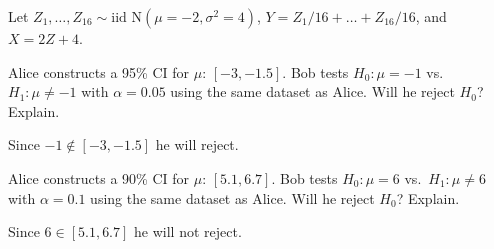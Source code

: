 \documentclass[addpoints,12pt]{exam}
\begin{document}
\begin{questions}

\question Let $Z_1, \dots, Z_{16} \sim \text{iid N}(\mu = -2, \sigma^2 = 4)$, $Y = Z_1/16 + \dots + Z_{16}/16$, and $X = 2Z + 4$.


\question Alice constructs a 95\% CI for $\mu$: $[-3, -1.5]$. Bob tests $H_0\colon \mu = -1$ vs.\ $H_1\colon \mu\neq -1$ with $\alpha = 0.05$ using the same dataset as Alice. Will he reject $H_0$? Explain.
\begin{solution}
  Since $-1 \notin [-3,-1.5]$ he will reject.
\end{solution}

\question Alice constructs a 90\% CI for $\mu$: $[5.1, 6.7]$. Bob tests $H_0\colon \mu = 6$ vs.\ $H_1\colon \mu\neq 6$ with $\alpha = 0.1$ using the same dataset as Alice. Will he reject $H_0$? Explain.
\begin{solution}
  Since $6 \in [5.1, 6.7]$ he will not reject.
\end{solution}


\end{questions}
\end{document}
